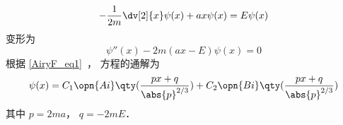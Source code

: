 

\begin{equation}
-\frac{1}{2m}\dv[2]{x}\psi(x) + ax \psi(x) = E\psi(x)
\end{equation}
变形为
\begin{equation}
\psi''(x) - 2m(ax - E)\psi(x) = 0
\end{equation}
根据 \autoref{AiryF_eq1}~， 方程的通解为
\begin{equation}
\psi(x) = C_1\opn{Ai}\qty(\frac{px+q}{\abs{p}^{2/3}}) + C_2 \opn{Bi}\qty(\frac{px+q}{\abs{p}^{2/3}})
\end{equation}
其中 $p = 2ma$， $q = -2mE$．
